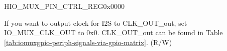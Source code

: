 \begin{register}{H}{IO\_MUX\_PIN\_CTRL\_REG}{0x0000}\label{regdesc:IOMUXPINCTRLREG}
%
%
%
%
\regnewline%
\begin{regdesc}\begin{reglist}
\label{fielddesc:IOMUXCLKOUT1}\item [IO\_MUX\_CLK\_OUT\regindex{x}] If you want to output clock for I2S to CLK\_OUT\_out, set IO\_MUX\_CLK\_OUT to 0x0.
CLK\_OUT\_out can be found in Table \ref{tab:iomuxgpio-periph-signals-via-gpio-matrix}. (R/W)
\end{reglist}\end{regdesc}
\end{register}


